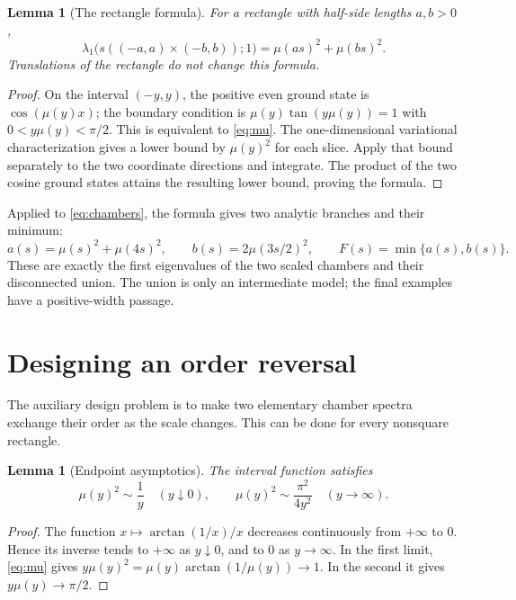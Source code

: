 \documentclass[11pt,a4paper]{article}
\newtheorem{lemma}[theorem]{Lemma}
\theoremstyle{definition}\newtheorem{definition}[theorem]{Definition}
\theoremstyle{remark}\newtheorem{remark}[theorem]{Remark}
\begin{document}
\begin{lemma}[The rectangle formula]\label{lem:rectangle}
For a rectangle with half-side lengths $a,b>0$,
\begin{equation}\label{eq:rectangle}
 \lambda_1\bigl(s((-a,a)\times(-b,b));1\bigr)
 =\mu(as)^2+\mu(bs)^2.
\end{equation}
Translations of the rectangle do not change this formula.
\end{lemma}
\begin{proof}
On the interval $(-y,y)$, the positive even ground state is
$\cos(\mu(y)x)$; the boundary condition is
$\mu(y)\tan(y\mu(y))=1$ with $0<y\mu(y)<\pi/2$.
This is equivalent to \eqref{eq:mu}. The one-dimensional
variational characterization gives a lower bound by $\mu(y)^2$
for each slice. Apply that bound separately to the two coordinate
directions and integrate. The product of the two cosine ground
states attains the resulting lower bound, proving the formula.
\end{proof}

Applied to \eqref{eq:chambers}, the formula gives two analytic
branches and their minimum:
\begin{equation}\label{eq:envelope}
 a(s)=\mu(s)^2+\mu(4s)^2,\qquad
 b(s)=2\mu(3s/2)^2,\qquad F(s)=\min\{a(s),b(s)\}.
\end{equation}
These are exactly the first eigenvalues of the two scaled
chambers and their disconnected union. The union is only an
intermediate model; the final examples have a positive-width
passage.

\section{Designing an order reversal}
\label{sec:design}

The auxiliary design problem is to make two elementary chamber
spectra exchange their order as the scale changes. This can be
done for every nonsquare rectangle.

\begin{lemma}[Endpoint asymptotics]\label{lem:asymptotics}
The interval function satisfies
\begin{equation}\label{eq:asymptotics}
 \mu(y)^2\sim\frac1y\quad(y\downarrow0),\qquad
 \mu(y)^2\sim\frac{\pi^2}{4y^2}\quad(y\to\infty).
\end{equation}
\end{lemma}
\begin{proof}
The function $x\mapsto\arctan(1/x)/x$ decreases continuously
from $+\infty$ to $0$. Hence its inverse tends to $+\infty$
as $y\downarrow0$, and to $0$ as $y\to\infty$. In the first
limit, \eqref{eq:mu} gives
$y\mu(y)^2=\mu(y)\arctan(1/\mu(y))\to1$.
In the second it gives $y\mu(y)\to\pi/2$.
\end{proof}
\end{document}
